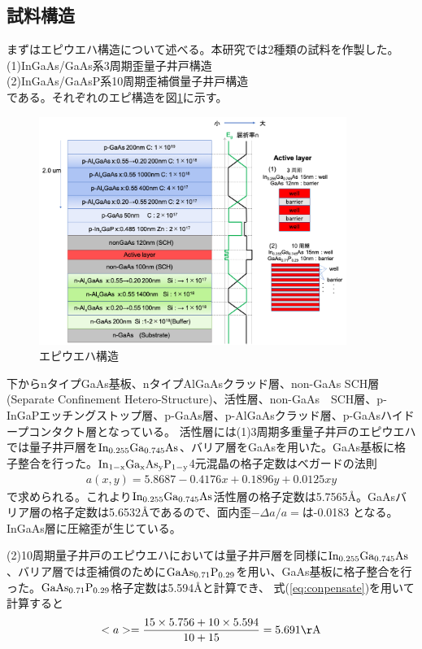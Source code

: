 \subsection{試料構造}%
まずはエピウエハ構造について述べる。本研究では2種類の試料を作製した。\\
(1)InGaAs/GaAs系3周期歪量子井戸構造\\
(2)InGaAs/GaAsP系10周期歪補償量子井戸構造\\
である。それぞれのエピ構造を図\ref{fig:fig_2_1_wafer_structure}に示す。
\begin{figure}[hb]
	\centering
	\includegraphics[width=10cm]{figure/fig_2_1_wafer_structure.png}
	\caption{エピウエハ構造}
	\label{fig:fig_2_1_wafer_structure}
\end{figure}
下からnタイプGaAs基板、nタイプAlGaAsクラッド層、non-GaAs SCH層(Separate Confinement Hetero-Structure)、活性層、non-GaAs　SCH層、p-InGaPエッチングストップ層、p-GaAs層、p-AlGaAsクラッド層、p-GaAsハイドープコンタクト層となっている。
活性層には(1)3周期多重量子井戸のエピウエハでは量子井戸層を$\rm{In_{0.255}Ga_{0.745}As}$、バリア層をGaAsを用いた。GaAs基板に格子整合を行った。$\rm{In_{1-x}Ga_{x}As_{y}P_{1-y}}$4元混晶の格子定数はべガードの法則
\begin{eqnarray}
a(x,y)=5.8687-0.4176x+0.1896y+0.0125xy
\end{eqnarray}
で求められる\cite{ref_iga}。これより$\rm{In_{0.255}Ga_{0.745}As}$活性層の格子定数は5.7565\AA 。GaAsバリア層の格子定数は5.6532\AA であるので、面内歪$-\Delta a/a=$は-0.0183 となる。InGaAs層に圧縮歪が生じている。

(2)10周期量子井戸のエピウエハにおいては量子井戸層を同様に$\rm{In_{0.255}Ga_{0.745}As}$、バリア層では歪補償のために$\rm{GaAs_{0.71}P_{0.29}}$を用い、GaAs基板に格子整合を行った。$\rm{GaAs_{0.71}P_{0.29}}$格子定数は5.594\AA と計算でき、
式(\ref{eq:conpensate})を用いて計算すると
\begin{eqnarray}
<a>=\dfrac{15 \times 5.756+10\times 5.594 }{10+15}=5.691\rm{\AA}
\end{eqnarray}


